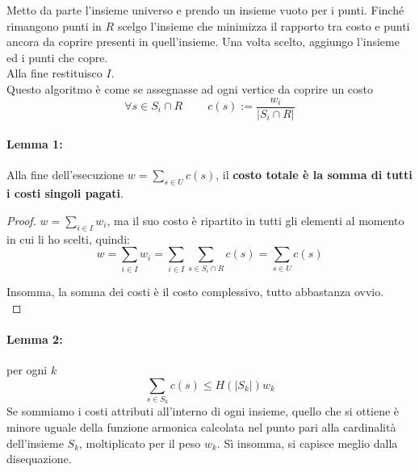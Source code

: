 Metto da parte l'insieme universo e prendo un insieme vuoto per i punti. Finché rimangono punti in $R$ scelgo l'insieme che minimizza il rapporto tra costo e punti ancora da coprire presenti in quell'insieme. Una volta scelto, aggiungo l'insieme ed i punti che copre.\\
Alla fine restituisco $I$.\\

Questo algoritmo è come se assegnasse ad ogni vertice da coprire un costo
$$\forall s \in S_i \cap R \;\;\;\;\;\;\;\; c(s) := \frac{w_i}{|S_i \cap R|}$$

\newpage

\paragraph{Lemma 1:} Alla fine dell'esecuzione $w = \sum_{s \in U} c(s)$, il \textbf{costo totale è la somma di tutti i costi singoli pagati}.\\

\begin{proof}
	$w = \sum_{i \in I} w_i$, ma il suo costo è ripartito in tutti gli elementi al momento in cui li ho scelti, quindi: 
	$$ w = \sum_{i \in I} w_i = \sum_{i \in I} \sum_{s \in S_i \cap R} c(s) = \sum_{s \in U} c(s) $$
	
	Insomma, la somma dei costi è il costo complessivo, tutto abbastanza ovvio.\\
\end{proof}

\paragraph{Lemma 2:} per ogni $k$ 
$$ \sum_{s \in S_k} c(s) \leq H(|S_k|) w_k $$
Se sommiamo i costi attributi all'interno di ogni insieme, quello che si ottiene è minore uguale della funzione armonica calcolata nel punto pari alla cardinalità dell'insieme $S_k$, moltiplicato per il peso $w_k$. Sì insomma, si capisce meglio dalla disequazione.\\

